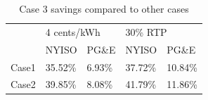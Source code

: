 \begin{table}[htb]
\normalsize
\renewcommand{\arraystretch}{1}
\caption{Case 3 savings compared to other cases}
\label{tab:Cost_comp}
\centering
\begin{tabular}{l|l|l|l|l|}
\cline{2-5}
                            & \multicolumn{2}{l|}{4 cents/kWh} & \multicolumn{2}{l|}{30\% RTP}   \\ \cline{2-5} 
                            & NYISO           & PG\&E          & NYISO          & PG\&E          \\ \hline
\multicolumn{1}{|l|}{Case1} & 35.52\%         & 6.93\%         & 37.72\%        & 10.84\%        \\ \hline
\multicolumn{1}{|l|}{Case2} & 39.85\%         & 8.08\%         & 41.79\%        & 11.86\%        \\ \hline
\end{tabular}
\end{table}
